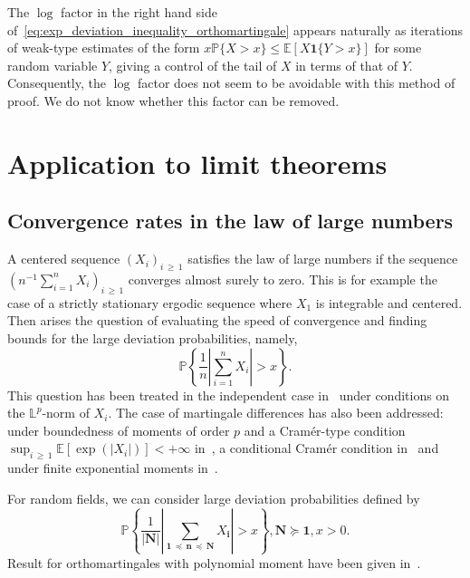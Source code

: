 \documentclass[AHL,Unicode,longabstracts,published]{cedram}
\newcommand{\bfun}{\mathbf{1}}
\newcommand\PP{\mathbb{P}}
\newcommand{\bbL}{\mathbb{L}}
\newcommand{\E}[1]{\mathbb E[#1]}
\newcommand\ens[1]{\{ #1\}}
\newcommand\abs[1]{|#1|}
\newcommand{\pr}[1]{(#1)}
\newcommand{\gr}[1]{\bm{#1}}
\newcommand{\gri}{\bm{i}}
\newcommand{\grn}{\bm{n}}
\newcommand{\imd}{\preccurlyeq}
\newcommand{\smd}{\succcurlyeq }
\begin{document}
\begin{rema}
The $\log$ factor in the right hand side of~\eqref{eq:exp_deviation_inequality_orthomartingale} appears naturally as iterations of weak-type estimates of the form $x\PP\ens{X>x}\leq \E{X\bfun\ens{Y>x}}$ for some random variable $Y$, giving a control of the tail of $X$ in terms of that of $Y$. Consequently, the $\log$ factor does not seem to be avoidable with this method of proof. We do not know whether this factor can be removed.
\end{rema}


\section{Application to limit theorems}

\subsection{Convergence rates in the law of large numbers}\label{subsec:LLN}
A centered sequence $\pr{X_i}_{i\,\geq\,1}$ satisfies the law of large numbers if the sequence $\pr{n^{-1}\sum_{i=1}^nX_i}_{i\,\geq\,1}$ converges almost surely to zero. This is for example the case of a strictly stationary ergodic sequence where $X_1$ is integrable and centered. Then arises the question of evaluating the speed of convergence and finding bounds for the large deviation probabilities, namely,
\begin{equation}
\PP\left\{\frac 1n\left| \sum_{i=1}^nX_i\right| >x\right\}.
\end{equation}
This question has been treated in the independent case in~\cite{MR30714,MR19852,MR79851} under conditions on the $\bbL^p$-norm of $X_i$. The case of martingale differences has also been addressed: under boundedness of moments of order $p$ and a Cramér-type condition $\sup_{i\,\geq\,1}\E{\exp\pr{\abs{X_i}}}<+\infty$ in~\cite{MR1856684}, a conditional Cramér condition in~\cite{MR2568267} and under finite exponential moments in~\cite{MR3005732}.

For random fields, we can consider large deviation probabilities defined by
\begin{equation}
\PP\left\{\frac 1{\left|\gr{N}\right|}\left| \sum_{\gr{1}\,\imd
\,\grn\,\imd\,\gr{N}} X_{\gri}\right| >x\right\}, \gr{N} \smd\gr{1}, x>0.
\end{equation}
Result for orthomartingales with polynomial moment have been given in~\cite{MR4046858,MR2794415,MR3451971}.
\end{document}
